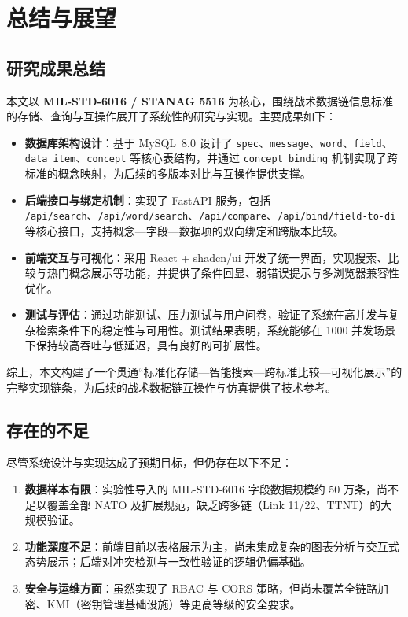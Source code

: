 \chapter{总结与展望}

\section{研究成果总结}

本文以 \textbf{MIL-STD-6016 / STANAG 5516} 为核心，围绕战术数据链信息标准的存储、查询与互操作展开了系统性的研究与实现。主要成果如下：

\begin{itemize}
  \item \textbf{数据库架构设计}：基于 MySQL~8.0 设计了 \texttt{spec}、\texttt{message}、\texttt{word}、\texttt{field}、\texttt{data\_item}、\texttt{concept} 等核心表结构，并通过 \texttt{concept\_binding} 机制实现了跨标准的概念映射，为后续的多版本对比与互操作提供支撑。
  \item \textbf{后端接口与绑定机制}：实现了 FastAPI 服务，包括 \texttt{/api/search}、\texttt{/api/word/search}、\texttt{/api/compare}、\texttt{/api/bind/field-to-di} 等核心接口，支持概念—字段—数据项的双向绑定和跨版本比较。
  \item \textbf{前端交互与可视化}：采用 React + shadcn/ui 开发了统一界面，实现搜索、比较与热门概念展示等功能，并提供了条件回显、弱错误提示与多浏览器兼容性优化。
  \item \textbf{测试与评估}：通过功能测试、压力测试与用户问卷，验证了系统在高并发与复杂检索条件下的稳定性与可用性。测试结果表明，系统能够在 1000 并发场景下保持较高吞吐与低延迟，具有良好的可扩展性。
\end{itemize}

综上，本文构建了一个贯通“标准化存储—智能搜索—跨标准比较—可视化展示”的完整实现链条，为后续的战术数据链互操作与仿真提供了技术参考。

\section{存在的不足}

尽管系统设计与实现达成了预期目标，但仍存在以下不足：

\begin{enumerate}
  \item \textbf{数据样本有限}：实验性导入的 MIL-STD-6016 字段数据规模约 50 万条，尚不足以覆盖全部 NATO 及扩展规范，缺乏跨多链（Link 11/22、TTNT）的大规模验证。
  \item \textbf{功能深度不足}：前端目前以表格展示为主，尚未集成复杂的图表分析与交互式态势展示；后端对冲突检测与一致性验证的逻辑仍偏基础。
  \item \textbf{安全与运维方面}：虽然实现了 RBAC 与 CORS 策略，但尚未覆盖全链路加密、KMI（密钥管理基础设施）等更高等级的安全要求。
\end{enumerate}

